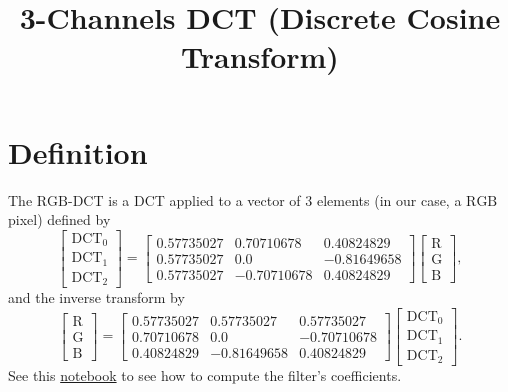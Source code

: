 
\title{3-Channels DCT (Discrete Cosine Transform)}

\maketitle

\tableofcontents

\section{Definition}

The $\text{RGB}$-DCT is a DCT applied to a vector of $3$ elements (in
our case, a $\text{RGB}$ pixel) defined by
\begin{equation}
  \begin{bmatrix}
    \text{DCT}_0 \\
    \text{DCT}_1 \\
    \text{DCT}_2
  \end{bmatrix}
  =
  \begin{bmatrix}
    0.57735027 & 0.70710678 & 0.40824829 \\
    0.57735027 & 0.0 & -0.81649658 \\
    0.57735027 & -0.70710678 & 0.40824829
  \end{bmatrix}
  \begin{bmatrix}
    \text{R} \\
    \text{G} \\
    \text{B}
  \end{bmatrix},
\end{equation}
and the inverse transform by
\begin{equation}
  \begin{bmatrix}
    \text{R} \\
    \text{G} \\
    \text{B}
  \end{bmatrix}
  =
  \begin{bmatrix}
    0.57735027 & 0.57735027 & 0.57735027 \\
    0.70710678 & 0.0 & -0.70710678 \\
    0.40824829 & -0.81649658 & 0.40824829
  \end{bmatrix}
  \begin{bmatrix}
    \text{DCT}_0 \\
    \text{DCT}_1 \\
    \text{DCT}_2
  \end{bmatrix}.
\end{equation}
See this
\href{https://github.com/Sistemas-Multimedia/Sistemas-Multimedia.github.io/blob/master/milestones/06-YUV_compression/color-DCT_matrix.ipynb}{notebook}
to see how to compute the filter's coefficients.

